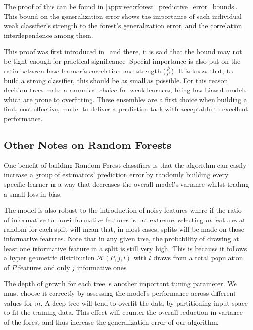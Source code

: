 The proof of this can be found in \cref{appx:sec:rforest_predictive_error_bounds}.\\

This bound on the generalization error shows the importance of each individual weak classifier's strength to the forest's generalization error, and the correlation interdependence among them.

This proof was first introduced in~\citep{breiman-randomforests} and there, it is said that the bound may not be tight enough for practical significance.
Special importance is also put on the ratio between base learner's correlation and strength ($\frac{\overline{\rho}}{s^2}$).
It is know that, to build a strong classifier, this should be as small as possible.
For this reason decision trees make a canonical choice for weak learners, being low biased models which are prone to overfitting.
These ensembles are a first choice when building a first, cost-effective, model to deliver a prediction task with acceptable to excellent performance.


\subsection{Other Notes on Random Forests}\label{subsection:random_forests_other_notes}

One benefit of building Random Forest classifiers is that the algorithm can easily increase a group of estimators' prediction error by randomly building every specific learner in a way that decreases the overall model's variance whilst trading a small loss in bias.

The model is also robust to the introduction of noisy features where if the ratio of informative to non-informative features is not extreme, selecting $m$ features at random for each split will mean that, in most cases, splits will be made on those informative features.
Note that in any given tree, the probability of drawing at least one informative feature in a split is still very high.
This is because it follows a hyper geometric distribution $\mathcal{H}(P,j,l)$ with $l$ draws from a total population of $P$ features and only $j$ informative ones.

The depth of growth for each tree is another important tuning parameter.
We must choose it correctly by assessing the model's performance across different values for $m$.
A deep tree will tend to overfit the data by partitioning input space to fit the training data.
This effect will counter the overall reduction in variance of the forest and thus increase the generalization error of our algorithm.

